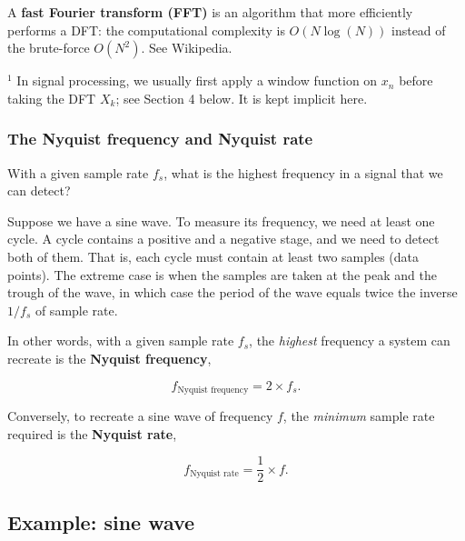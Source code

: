 \documentclass[11pt]{article}
\begin{document}
A \textbf{fast Fourier transform (FFT)} is an algorithm that more
efficiently performs a DFT: the computational complexity is
\(O(N\log(N))\) instead of the brute-force \(O(N^2)\). See Wikipedia.

\(^1\) In signal processing, we usually first apply a window function on
\(x_n\) before taking the DFT \(X_k\); see Section 4 below. It is kept
implicit here.

\hypertarget{the-nyquist-frequency-and-nyquist-rate}{%
\subsubsection{\texorpdfstring{The Nyquist frequency and Nyquist
rate}{The Nyquist frequency and Nyquist rate }}\label{the-nyquist-frequency-and-nyquist-rate}}

With a given sample rate \(f_s\), what is the highest frequency in a
signal that we can detect?

Suppose we have a sine wave. To measure its frequency, we need at least
one cycle. A cycle contains a positive and a negative stage, and we need
to detect both of them. That is, each cycle must contain at least two
samples (data points). The extreme case is when the samples are taken at
the peak and the trough of the wave, in which case the period of the
wave equals twice the inverse \(1/f_s\) of sample rate.

In other words, with a given sample rate \(f_s\), the \emph{highest}
frequency a system can recreate is the \textbf{Nyquist frequency},

\[f_{\text{Nyquist frequency}} = 2\times f_s.\tag{4}\]

Conversely, to recreate a sine wave of frequency \(f\), the
\emph{minimum} sample rate required is the \textbf{Nyquist rate},

\[f_{\text{Nyquist rate}} = \frac{1}{2}\times f.\tag{5}\]

    \hypertarget{example-sine-wave}{%
\subsection{Example: sine wave}\label{example-sine-wave}}
\end{document}
